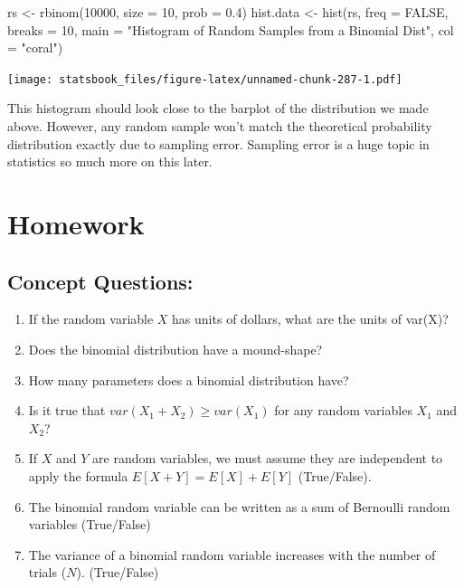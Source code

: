 \documentclass[
]{book}
\newenvironment{Shaded}{\begin{snugshade}}{\end{snugshade}}
\newcommand{\AttributeTok}[1]{\textcolor[rgb]{0.77,0.63,0.00}{#1}}
\newcommand{\ConstantTok}[1]{\textcolor[rgb]{0.00,0.00,0.00}{#1}}
\newcommand{\DecValTok}[1]{\textcolor[rgb]{0.00,0.00,0.81}{#1}}
\newcommand{\FloatTok}[1]{\textcolor[rgb]{0.00,0.00,0.81}{#1}}
\newcommand{\FunctionTok}[1]{\textcolor[rgb]{0.00,0.00,0.00}{#1}}
\newcommand{\NormalTok}[1]{#1}
\newcommand{\OtherTok}[1]{\textcolor[rgb]{0.56,0.35,0.01}{#1}}
\newcommand{\StringTok}[1]{\textcolor[rgb]{0.31,0.60,0.02}{#1}}
\providecommand{\tightlist}{%
  \setlength{\itemsep}{0pt}\setlength{\parskip}{0pt}}
\theoremstyle{definition}
\theoremstyle{definition}
\theoremstyle{definition}
\theoremstyle{definition}
\theoremstyle{remark}
\begin{document}
\begin{Shaded}
\begin{Highlighting}[]
\NormalTok{rs }\OtherTok{\textless{}{-}} \FunctionTok{rbinom}\NormalTok{(}\DecValTok{10000}\NormalTok{, }\AttributeTok{size =} \DecValTok{10}\NormalTok{, }\AttributeTok{prob =} \FloatTok{0.4}\NormalTok{)}
\NormalTok{hist.data }\OtherTok{\textless{}{-}} \FunctionTok{hist}\NormalTok{(rs, }\AttributeTok{freq =} \ConstantTok{FALSE}\NormalTok{, }\AttributeTok{breaks =} \DecValTok{10}\NormalTok{, }\AttributeTok{main =} \StringTok{"Histogram of Random Samples from a Binomial Dist"}\NormalTok{,}
    \AttributeTok{col =} \StringTok{"coral"}\NormalTok{)}
\end{Highlighting}
\end{Shaded}

\texttt{[image: statsbook\_files/figure-latex/unnamed-chunk-287-1.pdf]}

This histogram should look close to the barplot of the distribution we made above. However, any random sample won't match the theoretical probability distribution exactly due to sampling error. Sampling error is a huge topic in statistics so much more on this later.

\hypertarget{homework-5}{%
\section{Homework}\label{homework-5}}

\hypertarget{concept-questions-5}{%
\subsection{Concept Questions:}\label{concept-questions-5}}

\begin{enumerate}
\def\labelenumi{\arabic{enumi}.}
\tightlist
\item
  If the random variable \(X\) has units of dollars, what are the units of var(X)?
\item
  Does the binomial distribution have a mound-shape?
\item
  How many parameters does a binomial distribution have?
\item
  Is it true that \(var(X_1+X_2)\geq var(X_1)\) for any random variables \(X_1\) and \(X_2\)?
\item
  If \(X\) and \(Y\) are random variables, we must assume they are independent to apply the formula \(E[X+Y]=E[X]+E[Y]\) (True/False).
\item
  The binomial random variable can be written as a sum of Bernoulli random variables (True/False)
\item
  The variance of a binomial random variable increases with the number of trials (\(N\)). (True/False)
\end{enumerate}
\end{document}
